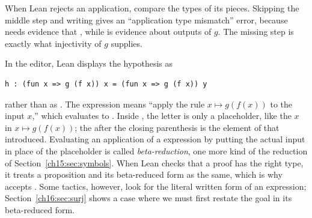 When Lean rejects an application, compare the types of its pieces. Skipping the middle step and writing  gives an ``application type mismatch'' error, because  needs evidence that , while  is evidence about outputs of $g$. The missing step is exactly what injectivity of $g$ supplies.

In the editor, Lean displays the hypothesis  as
\par\noindent\begin{minipage}{\linewidth}
\begin{lstlisting}
h : (fun x => g (f x)) x = (fun x => g (f x)) y
\end{lstlisting}
\end{minipage}\par
rather than as . The expression  means ``apply the rule $x\mapsto g(f(x))$ to the input $x$,'' which evaluates to . Inside , the letter  is only a placeholder, like the $x$ in $x\mapsto g(f(x))$; the  after the closing parenthesis is the element of  that  introduced. Evaluating an application of a  expression by putting the actual input in place of the placeholder is called \emph{beta-reduction}, one more kind of the reduction of Section~\ref{ch15:sec:symbols}. When Lean checks that a proof has the right type, it treats a proposition and its beta-reduced form as the same, which is why  accepts . Some tactics, however, look for the literal written form of an expression; Section~\ref{ch16:sec:surj} shows a case where we must first restate the goal in its beta-reduced form.
